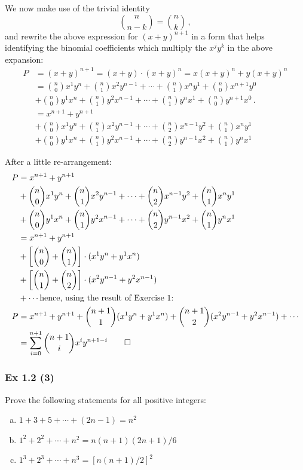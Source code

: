 {\begin{enumerate}[A)]
We now make use of the trivial identity 
$$\binom{n}{n-k} = \binom{n}{k}\,,$$ 
and rewrite the above expression for $(x + y)^{n+1}$ in a form that helps identifying the  binomial coefficients which multiply the  $x^j y^k$ in the above expansion:
\begin{align*}
P &=  (x + y)^{n+1} = (x + y) \cdot (x + y)^n  = x (x + y)^n + y (x + y)^n\\
  &=  \binom{n}{0} x^1 y^{n} + \binom{n}{1} x^2 y^{n-1} + \cdots + \binom{n}{1} x^{n} y^{1}  + \binom{n}{0} x^{n+1} y^{0}\\
  &+  \binom{n}{0} y^1 x^{n} + \binom{n}{1} y^2 x^{n-1} + \cdots + \binom{n}{1} y^{n} x^{1}  + \binom{n}{0} y^{n+1} x^{0}\,.\\
  &=  x^{n+1} + y^{n+1}\\
  &+  \binom{n}{0} x^1 y^{n} + \binom{n}{1} x^2 y^{n-1} + \cdots + \binom{n}{2} x^{n-1} y^{2} + \binom{n}{1} x^{n} y^{1}\\
  &+  \binom{n}{0} y^1 x^{n} + \binom{n}{1} y^2 x^{n-1} + \cdots + \binom{n}{2} y^{n-1} x^{2} + \binom{n}{1} y^{n} x^{1}
\end{align*}

After a little re-arrangement:  
\begin{align*}
P &=  x^{n+1} + y^{n+1}\\
  &+  \binom{n}{0} x^1 y^{n} + \binom{n}{1} x^2 y^{n-1} + \cdots + \binom{n}{2} x^{n-1} y^{2} + \binom{n}{1} x^{n} y^{1} \\
  &+  \binom{n}{0} y^1 x^{n} + \binom{n}{1} y^2 x^{n-1} + \cdots + \binom{n}{2} y^{n-1} x^{2} + \binom{n}{1} y^{n} x^{1}\\
  &=  x^{n+1} + y^{n+1} \\
  &+  \left[ \binom{n}{0} +  \binom{n}{1} \right] \cdot (x^{1} y^{n} + y^1 x^n)\\
  &+  \left[ \binom{n}{1} + \binom{n}{2} \right] \cdot (x^{2} y^{n-1} + y^2 x^{n-1})\\
  &+  \cdots \text{hence, using the result of Exercise 1:}\\
P &=  x^{n+1} + y^{n+1} + \binom{n+1}{1} (x^{1} y^{n} + y^1 x^n) + \binom{n+1}{2} (x^{2} y^{n-1} + y^2 x^{n-1}) + \cdots \\
  &=  \sum_{i=0}^{n+1} \binom{n+1}{i} x^i y^{n+1-i} \qed
\end{align*}

\end{enumerate}

\subsubsection{Ex 1.2 (3)}\label{sec:Ex_1.2.3}
Prove the following statements for all positive integers:
\begin{enumerate}[(a)]
\item $1 + 3 + 5 + \cdots + (2n - 1) = n^2$
\item $1^2 + 2^2 + \cdots + n^2 = n (n+1)(2n + 1)/6$
\item $1^3 + 2^3 + \cdots + n^3 = [n (n+1)/2]^2$
\end{enumerate}

}
